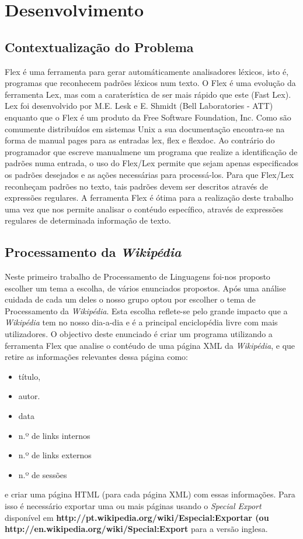 \documentclass[11pt, a4paper, oneside]{article}
\begin{document}
\newpage
\section{Desenvolvimento}

\subsection{Contextualização do Problema}

Flex é uma ferramenta para gerar automáticamente analisadores léxicos, isto é, programas que reconhecem padrões léxicos num texto. O Flex é uma evolução da ferramenta Lex, mas com a caraterística de ser mais rápido que este (Fast Lex). Lex foi desenvolvido por M.E. Lesk e E. Shmidt (Bell Laboratories - ATT) enquanto que o Flex é um produto da Free Software Foundation, Inc. Como são comumente distribuídos em sistemas Unix a sua documentação encontra-se na forma de manual pages para as entradas lex, flex e flexdoc. Ao contrário do programador que escreve manualmene um programa que realize a identificação de padrões numa entrada, o uso do Flex/Lex permite que sejam apenas especificados os padrões desejados e as ações necessárias para processá-los. Para que Flex/Lex reconheçam padrões no texto, tais padrões devem ser descritos através de expressões regulares. A ferramenta Flex é ótima para a realização deste trabalho uma vez que nos permite analisar o contéudo específico, através de expressões regulares de determinada informação de texto.

\subsection{Processamento da \textit{Wikipédia}}
Neste primeiro trabalho de Processamento de Linguagens foi-nos proposto escolher um tema a escolha, de vários enunciados propostos. Após uma análise cuidada  de cada um deles o nosso grupo optou por escolher o tema de Processamento da \textit{Wikipédia}. Esta escolha reflete-se pelo grande impacto que a \textit{Wikipédia} tem no nosso dia-a-dia e é a principal enciclopédia livre com mais utilizadores. 
O objectivo deste enunciado é criar um programa utilizando a ferramenta Flex que analise o contéudo de uma página XML da \textit{Wikipédia}, e que retire as informações relevantes dessa página como:
\begin{itemize}
\item título,
\item autor.
\item data
\item n.º de links internos
\item n.º de links externos
\item n.º de sessões 
\end{itemize}
e criar uma página HTML (para cada página XML) com essas informações. Para isso é necessário exportar uma ou mais páginas usando o \textit{Special Export} disponível em \textbf{http://pt.wikipedia.org/wiki/Especial:Exportar (ou \\http://en.wikipedia.org/wiki/Special:Export} para a versão inglesa.
\newpage
\end{document}
